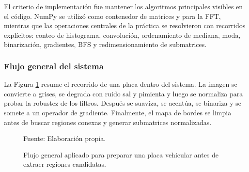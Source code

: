 \documentclass[11pt]{article}
\begin{document}
El criterio de implementación fue mantener los algoritmos principales visibles en el código. NumPy se utilizó como contenedor de matrices y para la FFT, mientras que las operaciones centrales de la práctica se resolvieron con recorridos explícitos: conteo de histograma, convolución, ordenamiento de mediana, moda, binarización, gradientes, BFS y redimensionamiento de submatrices.

\subsubsection{Flujo general del sistema}

La Figura \ref{fig:flujo_general} resume el recorrido de una placa dentro del sistema. La imagen se convierte a grises, se degrada con ruido sal y pimienta y luego se normaliza para probar la robustez de los filtros. Después se suaviza, se acentúa, se binariza y se somete a un operador de gradiente. Finalmente, el mapa de bordes se limpia antes de buscar regiones conexas y generar submatrices normalizadas.

\begin{figure}[H]
    \centering
    \caption{Flujo general aplicado para preparar una placa vehicular antes de extraer regiones candidatas.}
    \label{fig:flujo_general}
    \vspace{2pt}
    {\footnotesize Fuente: Elaboración propia.}
\end{figure}
\end{document}

